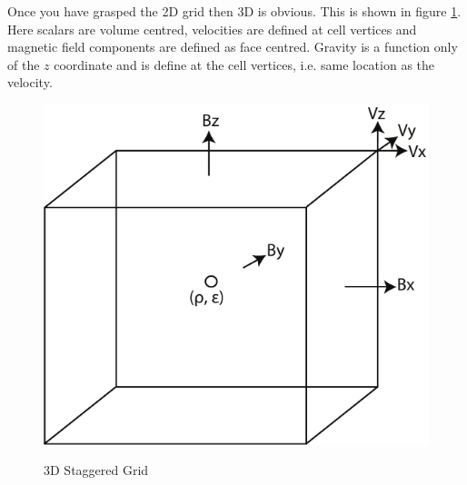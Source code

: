 \documentclass[11pt]{article}
\begin{document}
Once you have grasped the 2D grid then 3D is obvious. This is shown in figure \ref{3d-staggered}. Here scalars are volume centred, velocities are defined at cell vertices and magnetic field components are defined as face centred. Gravity is a function only of the $z$ coordinate and is define at the cell vertices, i.e. same location as the velocity.
\begin{figure}
\begin{center}{\includegraphics{3d-staggered-grid.pdf}}\end{center}
\caption{3D Staggered Grid}
\label{3d-staggered}
\end{figure}
\end{document}
